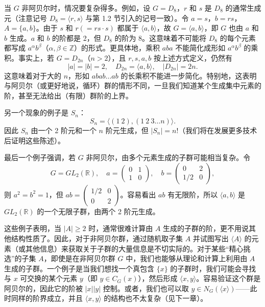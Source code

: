 当 \(G\) 非阿贝尔时，情况要复杂得多。例如，设 \(G = D_8\)，\(r\) 和 \(s\) 是 \(D_8\) 的通常生成元（注意记号 \(D_8 = \langle r, s \rangle\) 与第 1.2 节引入的记号一致）。令 \(a = s\)，\(b = rs\)，\(A = \{a, b\}\)。由于 \(s\) 和 \(r (= rs \cdot s)\) 都属于 \(\langle a, b \rangle\)，故 \(G = \langle a, b \rangle\)，即 \(G\) 也由 \(a\) 和 \(b\) 生成。\(a\) 和 \(b\) 的阶都是 2，但 \(D_8\) 的阶为 8。这意味着不可能将 \(D_8\) 的每个元素都写成 \(a^{\alpha} b^{\beta}\)（\(\alpha, \beta \in \mathbb{Z}\)）的形式。更具体地，乘积 \(aba\) 不能简化成形如 \(a^{\alpha} b^{\beta}\) 的乘积。事实上，若 \(G = D_{2n}\)（\(n > 2\)），且 \(r, s, a, b\) 按上述方式定义，仍然有
\[
|a| = |b| = 2,\quad D_{2n} = \langle a, b \rangle,\quad |D_{2n}| = 2n.
\]
这意味着对于大的 \(n\)，形如 \(abab \ldots ab\) 的长乘积不能进一步简化。特别地，这表明与阿贝尔（或更好地说，循环）群的情形不同，一旦我们知道某个生成集中元素的阶，甚至无法给出（有限）群阶的上界。

另一个现象的例子是 \(S_n\)：
\[
S_n = \langle (1\ 2), (1\ 2\ 3 \ldots n) \rangle.
\]
因此 \(S_n\) 由一个 2 阶元和一个 \(n\) 阶元生成，但 \(|S_n| = n!\)（我们将在发展更多技术后证明这些陈述）。

最后一个例子强调，若 \(G\) 非阿贝尔，由多个元素生成的子群可能相当复杂。令
\[
G = GL_2(\mathbb{R}),\quad a = \begin{pmatrix} 0 & 1 \\ 1 & 0 \end{pmatrix},\quad b = \begin{pmatrix} 0 & 2 \\ 1/2 & 0 \end{pmatrix},
\]
则 \(a^2 = b^2 = 1\)，但 \(ab = \begin{pmatrix} 1/2 & 0 \\ 0 & 2 \end{pmatrix}\)。容易看出 \(ab\) 有无限阶，所以 \(\langle a, b \rangle\) 是 \(GL_2(\mathbb{R})\) 的一个无限子群，由两个 2 阶元生成。

这些例子表明，当 \(|A| \geq 2\) 时，通常很难计算由 \(A\) 生成的子群的阶，更不用说其他结构性质了。因此，对于非阿贝尔群，通过随机取子集 \(A\) 并试图写出 \(\langle A \rangle\) 的元素（或其他信息）来获取关于子群的大量信息是不切实际的。对于某些“精心挑选”的子集 \(A\)，即使是在非阿贝尔群 \(G\) 中，我们也能够从理论和计算上利用由 \(A\) 生成的子群。一个例子是当我们想找一个真包含 \(\{x\}\) 的子群时，我们可能会寻找与 \(x\) 可交换的某个元素 \(y\)（即 \(y \in C_G(x)\)），然后形成 \(\langle x, y \rangle\)。容易验证这个群是阿贝尔的，因此它的阶被 \(|x||y|\) 控制。或者，我们也可以取 \(y \in N_G(\langle x \rangle)\)——此时同样的阶界成立，并且 \(\langle x, y \rangle\) 的结构也不太复杂（见下一章）。

